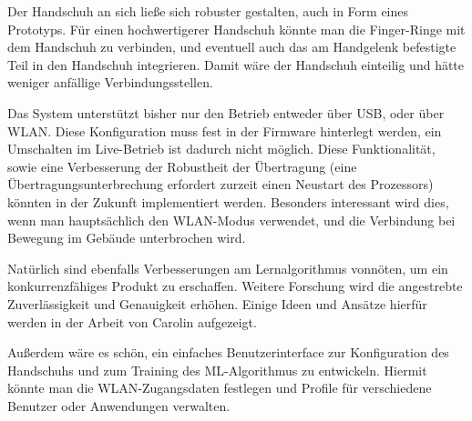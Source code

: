 Der Handschuh an sich ließe sich robuster gestalten, auch in Form eines
Prototyps. Für einen hochwertigerer Handschuh könnte man die Finger-Ringe mit
dem Handschuh zu verbinden, und eventuell auch das am Handgelenk befestigte
Teil in den Handschuh integrieren. Damit wäre der Handschuh einteilig und hätte
weniger anfällige Verbindungsstellen.

Das System unterstützt bisher nur den Betrieb entweder über USB, oder über
WLAN. Diese Konfiguration muss fest in der Firmware hinterlegt werden, ein
Umschalten im Live-Betrieb ist dadurch nicht möglich. Diese Funktionalität,
sowie eine Verbesserung der Robustheit der Übertragung (eine
Übertragungsunterbrechung erfordert zurzeit einen Neustart des Prozessors)
könnten in der Zukunft implementiert werden. Besonders interessant wird dies,
wenn man hauptsächlich den WLAN-Modus verwendet, und die Verbindung bei
Bewegung im Gebäude unterbrochen wird.

Natürlich sind ebenfalls Verbesserungen am Lernalgorithmus vonnöten, um ein
konkurrenzfähiges Produkt zu erschaffen. Weitere Forschung wird die angestrebte
Zuverlässigkeit und Genauigkeit erhöhen. Einige Ideen und Ansätze hierfür
werden in der Arbeit von Carolin \citet{caro} aufgezeigt.

Außerdem wäre es schön, ein einfaches Benutzerinterface zur Konfiguration des
Handschuhs und zum Training des ML-Algorithmus zu entwickeln. Hiermit könnte
man die WLAN-Zugangsdaten festlegen und Profile für verschiedene Benutzer oder
Anwendungen verwalten.

